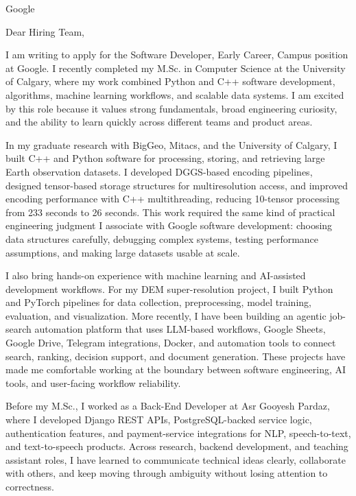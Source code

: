 \documentclass[11pt]{letter}
\begin{document}
\begin{letter}{Google}

\opening{Dear Hiring Team,}

I am writing to apply for the Software Developer, Early Career, Campus position at Google. I recently completed my M.Sc. in Computer Science at the University of Calgary, where my work combined Python and C++ software development, algorithms, machine learning workflows, and scalable data systems. I am excited by this role because it values strong fundamentals, broad engineering curiosity, and the ability to learn quickly across different teams and product areas.

In my graduate research with BigGeo, Mitacs, and the University of Calgary, I built C++ and Python software for processing, storing, and retrieving large Earth observation datasets. I developed DGGS-based encoding pipelines, designed tensor-based storage structures for multiresolution access, and improved encoding performance with C++ multithreading, reducing 10-tensor processing from 233 seconds to 26 seconds. This work required the same kind of practical engineering judgment I associate with Google software development: choosing data structures carefully, debugging complex systems, testing performance assumptions, and making large datasets usable at scale.

I also bring hands-on experience with machine learning and AI-assisted development workflows. For my DEM super-resolution project, I built Python and PyTorch pipelines for data collection, preprocessing, model training, evaluation, and visualization. More recently, I have been building an agentic job-search automation platform that uses LLM-based workflows, Google Sheets, Google Drive, Telegram integrations, Docker, and automation tools to connect search, ranking, decision support, and document generation. These projects have made me comfortable working at the boundary between software engineering, AI tools, and user-facing workflow reliability.

Before my M.Sc., I worked as a Back-End Developer at Asr Gooyesh Pardaz, where I developed Django REST APIs, PostgreSQL-backed service logic, authentication features, and payment-service integrations for NLP, speech-to-text, and text-to-speech products. Across research, backend development, and teaching assistant roles, I have learned to communicate technical ideas clearly, collaborate with others, and keep moving through ambiguity without losing attention to correctness.


\end{letter}
\end{document}
